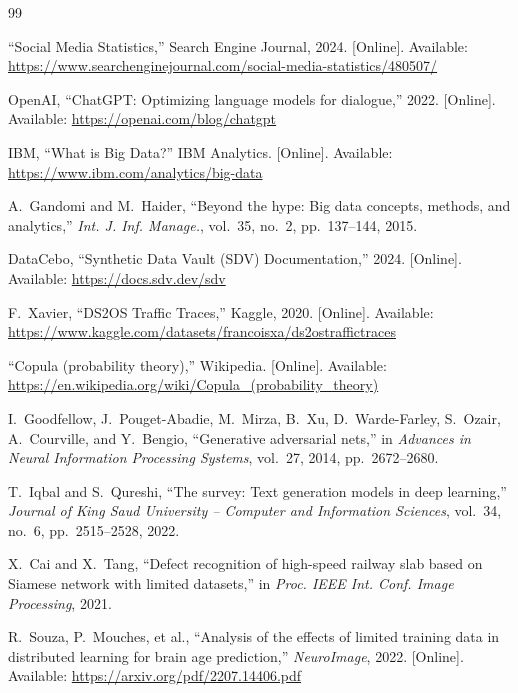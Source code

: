 \documentclass[conference]{IEEEtran}
\begin{document}
\begin{thebibliography}{99}

``Social Media Statistics,'' Search Engine Journal, 2024. [Online]. Available: \url{https://www.searchenginejournal.com/social-media-statistics/480507/}

OpenAI, ``ChatGPT: Optimizing language models for dialogue,'' 2022. [Online]. Available: \url{https://openai.com/blog/chatgpt}

IBM, ``What is Big Data?'' IBM Analytics. [Online]. Available: \url{https://www.ibm.com/analytics/big-data}

A.~Gandomi and M.~Haider, ``Beyond the hype: Big data concepts, methods, and analytics,'' \emph{Int. J. Inf. Manage.}, vol.~35, no.~2, pp.~137--144, 2015.

DataCebo, ``Synthetic Data Vault (SDV) Documentation,'' 2024. [Online]. Available: \url{https://docs.sdv.dev/sdv}

F.~Xavier, ``DS2OS Traffic Traces,'' Kaggle, 2020. [Online]. Available: \url{https://www.kaggle.com/datasets/francoisxa/ds2ostraffictraces}

``Copula (probability theory),'' Wikipedia. [Online]. Available: \url{https://en.wikipedia.org/wiki/Copula_(probability_theory)}

I.~Goodfellow, J.~Pouget-Abadie, M.~Mirza, B.~Xu, D.~Warde-Farley, S.~Ozair, A.~Courville, and Y.~Bengio, ``Generative adversarial nets,'' in \emph{Advances in Neural Information Processing Systems}, vol.~27, 2014, pp.~2672--2680.

T.~Iqbal and S.~Qureshi, ``The survey: Text generation models in deep learning,'' \emph{Journal of King Saud University -- Computer and Information Sciences}, vol.~34, no.~6, pp.~2515--2528, 2022.

X.~Cai and X.~Tang, ``Defect recognition of high-speed railway slab based on Siamese network with limited datasets,'' in \emph{Proc. IEEE Int. Conf. Image Processing}, 2021.

R.~Souza, P.~Mouches, et al., ``Analysis of the effects of limited training data in distributed learning for brain age prediction,'' \emph{NeuroImage}, 2022. [Online]. Available: \url{https://arxiv.org/pdf/2207.14406.pdf}


\end{thebibliography}
\end{document}
